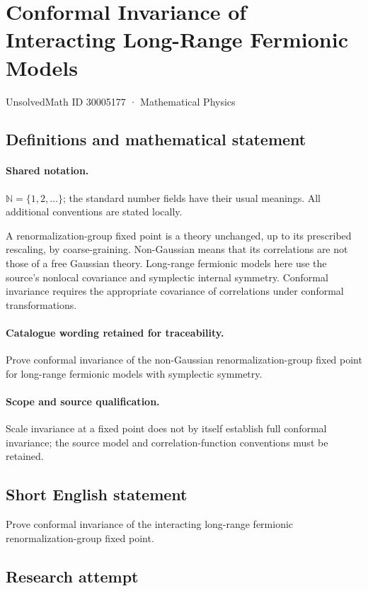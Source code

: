 \documentclass[11pt]{article}
\begin{document}
\setcounter{section}{30005176}
\section{Conformal Invariance of Interacting Long-Range Fermionic Models}\label{30005177}
{\small UnsolvedMath ID 30005177 · Mathematical Physics}
\subsection{Definitions and mathematical statement}

\paragraph{Shared notation.}$\mathbb N=\{1,2,\ldots\}$; the standard number fields have their usual meanings. All additional conventions are stated locally.


A renormalization-group fixed point is a theory unchanged, up to its prescribed rescaling, by coarse-graining. Non-Gaussian means that its correlations are not those of a free Gaussian theory. Long-range fermionic models here use the source's nonlocal covariance and symplectic internal symmetry. Conformal invariance requires the appropriate covariance of correlations under conformal transformations.

\paragraph{Catalogue wording retained for traceability.}
Prove conformal invariance of the non-Gaussian renormalization-group fixed point for long-range fermionic models with symplectic symmetry.

\paragraph{Scope and source qualification.}Scale invariance at a fixed point does not by itself establish full conformal invariance; the source model and correlation-function conventions must be retained.
\subsection{Short English statement}
Prove conformal invariance of the interacting long-range fermionic renormalization-group fixed point.
\subsection{Research attempt}
\end{document}
